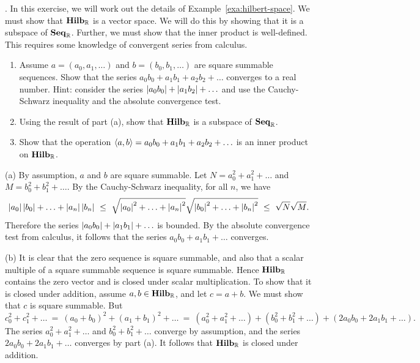 \begin{ex}\label{ex:hilbert-space}.
  In this exercise, we will work out the details of
  Example~\ref{exa:hilbert-space}. We must show that $\mathbf{Hilb}_{\mathbb{R}}$ is a
  vector space. We will do this by showing that it is a subspace of
  $\mathbf{Seq}_{\mathbb{R}}$. Further, we must show that the inner product is
  well-defined. This requires some knowledge of convergent series from
  calculus.
  \begin{enumerate}
  \item Assume $a=(a_0,a_1,\ldots)$ and $b=(b_0,b_1,\ldots)$ are
    square summable sequences. Show that the series
    $a_0b_0 + a_1b_1 + a_2b_2 + \ldots$ converges to a real
    number. Hint: consider the series
    $\left|a_0b_0\right| + \left|a_1b_2\right| + \ldots$ and use the Cauchy-Schwarz
    inequality and the absolute convergence test.
  \item Using the result of part (a), show that $\mathbf{Hilb}_{\mathbb{R}}$ is a
    subspace of $\mathbf{Seq}_{\mathbb{R}}$.
  \item Show that the operation $\langle a,b\rangle = a_0b_0 + a_1b_1 +
    a_2b_2 + \ldots$ is an inner product on $\mathbf{Hilb}_{\mathbb{R}}$.
  \end{enumerate}
  \begin{sol}
    (a) By assumption, $a$ and $b$ are square summable. Let
    $N=a_0^2 + a_1^2 + \ldots$ and $M=b_0^2 + b_1^2 + \ldots$.
    By the Cauchy-Schwarz inequality, for all $n$, we have
    \begin{equation*}
      \left|a_0\right|\left|b_0\right| + \ldots + \left|a_n\right|\left|b_n\right|
      ~\leq~ \sqrt{\left|a_0\right|^2 + \ldots + \left|a_n\right|^2} \sqrt{\left|b_0\right|^2 + \ldots + \left|b_n\right|^2}
      ~\leq~ \sqrt{N}\sqrt{M}.
    \end{equation*}
    Therefore the series $\left|a_0b_0\right| + \left|a_1b_1\right| + \ldots$ is
    bounded. By the absolute convergence test from calculus, it
    follows that the series $a_0b_0 + a_1b_1 + \ldots$ converges.

    (b) It is clear that the zero sequence is square summable, and
    also that a scalar multiple of a square summable sequence is
    square summable. Hence $\mathbf{Hilb}_{\mathbb{R}}$ contains the zero vector and
    is closed under scalar multiplication. To show that it is closed
    under addition, assume $a,b\in\mathbf{Hilb}_{\mathbb{R}}$, and let $c=a+b$. We
    must show that $c$ is square summable. But
    \begin{equation*}
      c_0^2 + c_1^2 + \ldots
      ~=~
      (a_0+b_0)^2 + (a_1+b_1)^2 + \ldots
      ~=~ (a_0^2 + a_1^2 + \ldots) + (b_0^2 + b_1^2 + \ldots)
      + (2a_0b_0 + 2a_1b_1 + \ldots).
    \end{equation*}
    The series $a_0^2 + a_1^2 + \ldots$ and $b_0^2 + b_1^2 + \ldots$
    converge by assumption, and the series $2a_0b_0 + 2a_1b_1 +
    \ldots$ converges by part (a). It follows that $\mathbf{Hilb}_{\mathbb{R}}$ is
    closed under addition.


\end{sol}
\end{ex}
